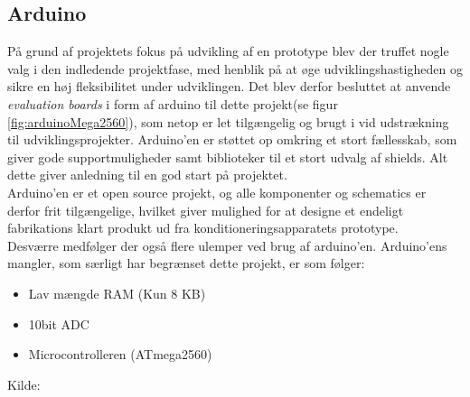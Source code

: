 \subsection{Arduino}
\begin{minipage}[t]{0.6\textwidth}
På grund af projektets fokus på udvikling af en prototype blev der truffet nogle valg i den indledende projektfase, med henblik på at øge udviklingshastigheden og sikre en høj fleksibilitet under udviklingen. Det blev derfor besluttet at anvende \textit{evaluation boards} i form af arduino til dette projekt(se figur \ref{fig:arduinoMega2560}), som netop er let tilgængelig og brugt i vid udstrækning til udviklingsprojekter. Arduino'en er støttet op omkring et stort fællesskab, som giver gode supportmuligheder samt biblioteker til et stort udvalg af shields. Alt dette giver anledning til en god start på projektet.\\

Arduino'en er et open source projekt, og alle komponenter og schematics er derfor frit tilgængelige, hvilket giver mulighed for at designe et endeligt fabrikations klart produkt ud fra konditioneringsapparatets prototype.\\

Desværre medfølger der også flere ulemper ved brug af arduino'en. Arduino'ens mangler, som særligt har begrænset dette projekt, er som følger:\\

\begin{itemize}
	\item Lav mængde RAM (Kun 8 KB) 
	\item 10bit ADC
	\item Microcontrolleren (ATmega2560)
\end{itemize}
Kilde: \cite{RefWorks:40}

\end{minipage}
